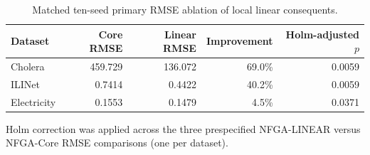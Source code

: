 \begin{table}[t]
\centering
\caption{Matched ten-seed primary RMSE ablation of local linear consequents.}
\label{tab:nfga_primary_rmse_ablation}
\begin{tabular}{lrrrr}
\toprule
Dataset & Core RMSE & Linear RMSE & Improvement & Holm-adjusted $p$ \\
\midrule
Cholera & 459.729 & 136.072 & 69.0\% & 0.0059 \\
ILINet & 0.7414 & 0.4422 & 40.2\% & 0.0059 \\
Electricity & 0.1553 & 0.1479 & 4.5\% & 0.0371 \\
\bottomrule
\end{tabular}
\begin{minipage}{0.96\linewidth}
\footnotesize Holm correction was applied across the three prespecified NFGA-LINEAR versus NFGA-Core RMSE comparisons (one per dataset).
\end{minipage}
\end{table}